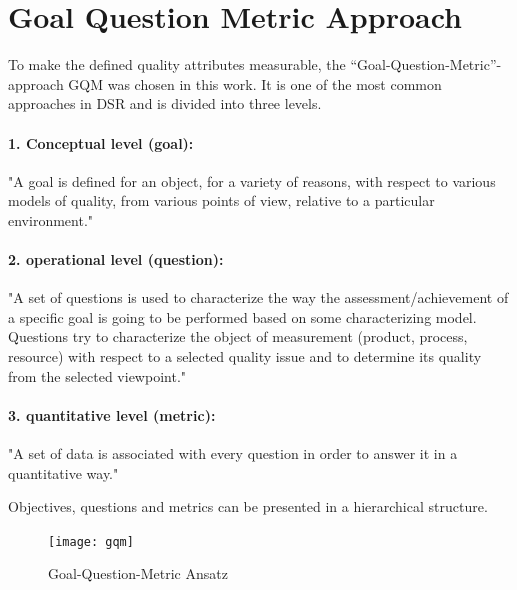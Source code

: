 \section{Goal Question Metric Approach}\label{subsec:goal-question-metric-approach}
To make the defined quality attributes measurable, the “Goal-Question-Metric”-approach \ac{GQM}
was chosen in this work. It is one of the most common approaches in DSR and is divided into three
levels.
\cite[p. 3]{basili_goalquestionmetric_}

\paragraph{1. Conceptual level (goal):}
"A goal is defined for an object, for a variety of reasons,
with respect to various models of quality, from various points of view, relative to a
particular environment." \cite[p. 3]{basili_goalquestionmetric_}

\paragraph{2. operational level (question):}
"A set of questions is used to characterize the way
the assessment/achievement of a specific goal is going to be performed based on
some characterizing model. Questions try to characterize the object of
measurement (product, process, resource) with respect to a selected quality issue
and to determine its quality from the selected viewpoint." \cite[p. 3]{basili_goalquestionmetric_}

\paragraph{3. quantitative level (metric):}
"A set of data is associated with every question in order to answer it in a quantitative way."
\cite[p. 3]{basili_goalquestionmetric_}

Objectives, questions and metrics can be presented in a hierarchical structure.

\begin{figure}[H] %
    \begin{tcolorbox}[arc=0pt,boxrule=0.5pt]
        \centering
        \texttt{[image: gqm]}
        \caption[GQM tree stucture ]{Goal-Question-Metric Ansatz \cite[p.
        3]{basili_goalquestionmetric_}}
        \label{fig:gqm}
    \end{tcolorbox}
\end{figure}
